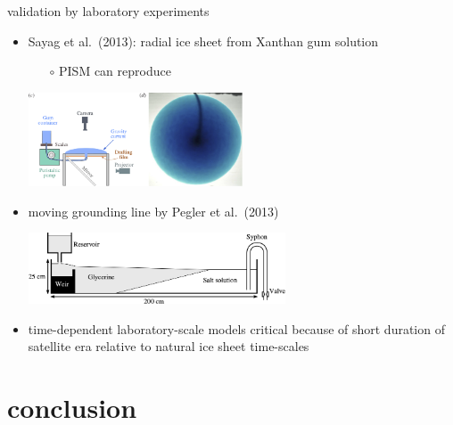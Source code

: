 \documentclass[10pt,hyperref={pdfpagelabels=true}]{beamer}
\begin{document}
\begin{frame}{validation by laboratory experiments}

\begin{itemize}
\item Sayag et al.~(2013): radial ice sheet from Xanthan gum solution
    \begin{itemize}
    \item[$\circ$] PISM can reproduce   
    \end{itemize}

\smallskip
\begin{center}
\includegraphics[width=0.5\textwidth]{labgumexperiment}
\end{center}

\item moving grounding line by Pegler et al.~(2013)

\medskip
\begin{center}
\includegraphics[width=0.6\textwidth]{pegler2014-grounding-line-schematic}
\end{center}
\item time-dependent laboratory-scale models \alert{critical} because of short duration of satellite era relative to natural ice sheet time-scales
\end{itemize}

\end{frame}


\section*{conclusion}
\end{document}
